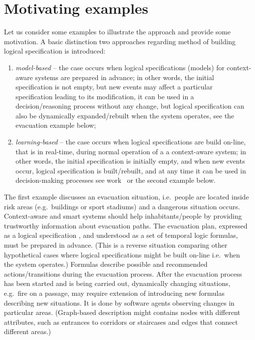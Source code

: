 \documentclass[runningheads,a4paper]{llncs}
\begin{document}
\section{Motivating examples}
\label{sec:examples}

Let us consider some examples to illustrate the approach and provide some motivation.
A basic distinction two approaches regarding method of building logical specification is introduced:
\begin{enumerate}
  \item \emph{model-based} -- the case occurs when logical specifications (models) for context-aware systems are prepared in advance;
                                    in other words, the initial specification is not empty,
                                    but new events may affect a particular specification leading to its modification,
                                    it can be used in a decision/reasoning process without any change,
                                    but logical specification can also be dynamically expanded/rebuilt when the system operates,
                                    see the evacuation example below;
  \item \emph{learning-based} -- the case occurs when logical specifications are build on-line, that is in real-time,
                                    during normal operation of a a context-aware system;
                                    in other words, the initial specification is initially empty,
                                    and when new events occur, logical specification is built/rebuilt,
                                    and at any time it can be used in decision-making processes
                                    see work~\cite{Klimek-Kotulski-2014-IE-AITAmI} or the second example below.
\end{enumerate}

The first example discusses an evacuation situation,
i.e.\ people are located inside risk areas (e.g.\ buildings or sport stadiums)
and a dangerous situation occurs.
Context-aware and smart systems should help inhabitants/people by providing trustworthy information about evacuation paths.
The evacuation plan,
expressed as a logical specification ,
and understood as a set of temporal logic formulas,
must be prepared in advance.
(This is a reverse situation comparing other hypothetical cases where logical specifications might be built on-line
i.e.\ when the system operates.)
Formulas describe possible and recommended actions/transitions during the evacuation process.
After the evacuation process has been started and is being carried out,
dynamically changing situations, e.g.\ fire on a passage,
may require extension of  introducing new formulas describing new situations.
It is done by software agents observing changes in particular areas.
(Graph-based description might contains nodes with different attributes,
such as entrances to corridors or staircases and edges that connect different areas.)
\end{document}
